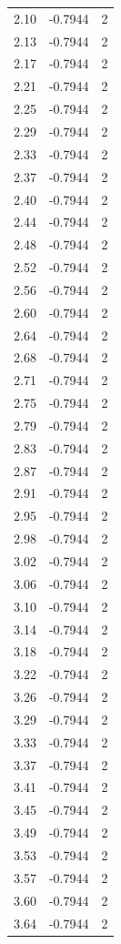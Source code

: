 \begin{longtable}{lrr}
  2.10 & -0.7944 & 2 \\
  2.13 & -0.7944 & 2 \\
  2.17 & -0.7944 & 2 \\
  2.21 & -0.7944 & 2 \\
  2.25 & -0.7944 & 2 \\
  2.29 & -0.7944 & 2 \\
  2.33 & -0.7944 & 2 \\
  2.37 & -0.7944 & 2 \\
  2.40 & -0.7944 & 2 \\
  2.44 & -0.7944 & 2 \\
  2.48 & -0.7944 & 2 \\
  2.52 & -0.7944 & 2 \\
  2.56 & -0.7944 & 2 \\
  2.60 & -0.7944 & 2 \\
  2.64 & -0.7944 & 2 \\
  2.68 & -0.7944 & 2 \\
  2.71 & -0.7944 & 2 \\
  2.75 & -0.7944 & 2 \\
  2.79 & -0.7944 & 2 \\
  2.83 & -0.7944 & 2 \\
  2.87 & -0.7944 & 2 \\
  2.91 & -0.7944 & 2 \\
  2.95 & -0.7944 & 2 \\
  2.98 & -0.7944 & 2 \\
  3.02 & -0.7944 & 2 \\
  3.06 & -0.7944 & 2 \\
  3.10 & -0.7944 & 2 \\
  3.14 & -0.7944 & 2 \\
  3.18 & -0.7944 & 2 \\
  3.22 & -0.7944 & 2 \\
  3.26 & -0.7944 & 2 \\
  3.29 & -0.7944 & 2 \\
  3.33 & -0.7944 & 2 \\
  3.37 & -0.7944 & 2 \\
  3.41 & -0.7944 & 2 \\
  3.45 & -0.7944 & 2 \\
  3.49 & -0.7944 & 2 \\
  3.53 & -0.7944 & 2 \\
  3.57 & -0.7944 & 2 \\
  3.60 & -0.7944 & 2 \\
  3.64 & -0.7944 & 2 \\

\end{longtable}

